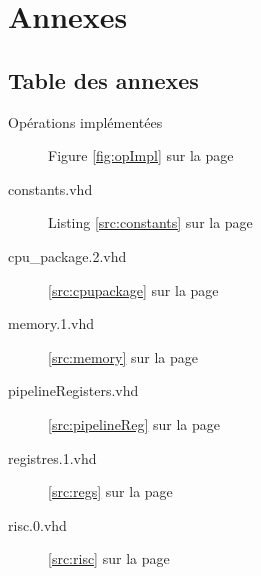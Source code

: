 \chapter{Annexes}

\section{Table des annexes}
\begin{description}
  \item[Opérations implémentées] Figure \ref{fig:opImpl} sur la page \pageref{fig:opImpl}
  \item[constants.vhd] Listing \ref{src:constants} sur la page \pageref{src:constants} 
  \item[cpu\_package.2.vhd] \ref{src:cpupackage} sur la page \pageref{src:cpupackage} 
  \item[memory.1.vhd] \ref{src:memory} sur la page \pageref{src:memory}
  \item[pipelineRegisters.vhd] \ref{src:pipelineReg} sur la page \pageref{src:pipelineReg}
  \item[registres.1.vhd] \ref{src:regs} sur la page \pageref{src:regs}
  \item[risc.0.vhd] \ref{src:risc} sur la page \pageref{src:risc}
\end{description}

